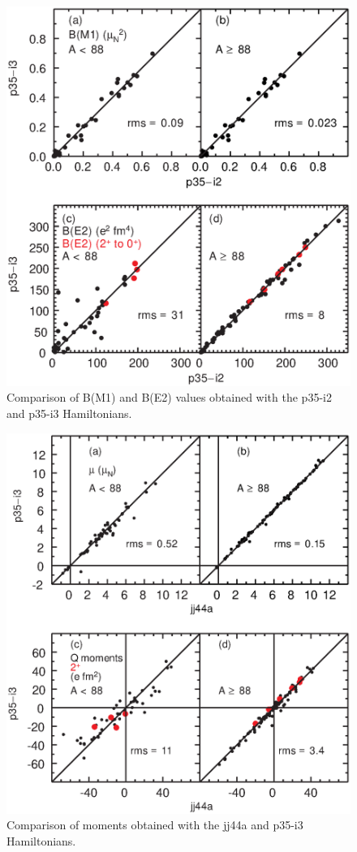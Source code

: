 \documentclass[aps,prl,twocolumn,tightenlines,superscriptaddress,showpacs]{revtex4-1}
\begin{document}
\begin{figure}
\includegraphics[scale=0.40]{b35.eps}
\caption{Comparison of B(M1) and B(E2) values obtained with the
p35-i2 and p35-i3 Hamiltonians.
}
\label{ (4) }
\end{figure}



\begin{figure}
\includegraphics[scale=0.40]{ma.eps}
\caption{Comparison of  moments obtained with the
jj44a and p35-i3 Hamiltonians.
}
\label{ (5) }
\end{figure}
\end{document}
